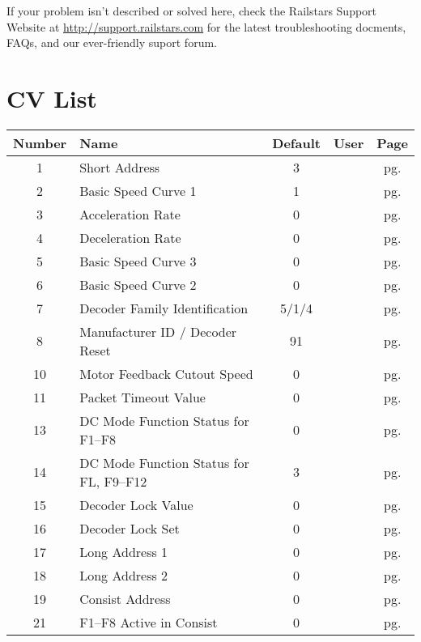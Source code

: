 \documentclass[12pt,letterpaper,draft]{memoir} %
\begin{document}
If your problem isn't described or solved here, check the Railstars Support Website at \url{http://support.railstars.com} for the latest troubleshooting docments, FAQs, and our ever-friendly suport forum.


\appendix
\chapter{CV List}

\begin{center}
\begin{longtable}{|c|l|c|c|c|}
\hline
Number&Name&Default&User&Page \\ \hline\hline
1&Short Address&3&&pg. \pageref{CV1} \\ \hline
2&Basic Speed Curve 1&1&&pg. \pageref{CV2} \\ \hline
3&Acceleration Rate&0&&pg. \pageref{CV3} \\ \hline
4&Deceleration Rate&0&&pg. \pageref{CV4} \\ \hline
5&Basic Speed Curve 3&0&&pg. \pageref{CV5} \\ \hline
6&Basic Speed Curve 2&0&&pg. \pageref{CV6} \\ \hline
7&Decoder Family Identification&5/1/4&&pg. \pageref{CV7} \\ \hline
8&Manufacturer ID / Decoder Reset&91&&pg. \pageref{CV8} \\ \hline
10&Motor Feedback Cutout Speed&0&&pg. \pageref{CV10} \\ \hline
11&Packet Timeout Value&0&&pg. \pageref{CV11} \\ \hline
13&DC Mode Function Status for F1--F8&0&&pg. \pageref{CV13} \\ \hline
14&DC Mode Function Status for FL, F9--F12&3&&pg. \pageref{CV14} \\ \hline
15&Decoder Lock Value&0&&pg. \pageref{CV15} \\ \hline
16&Decoder Lock Set&0&&pg. \pageref{CV16} \\ \hline
17&Long Address 1&0&&pg. \pageref{CV17} \\ \hline
18&Long Address 2&0&&pg. \pageref{CV18} \\ \hline
19&Consist Address&0&&pg. \pageref{CV19} \\ \hline
21&F1--F8 Active in Consist&0&&pg. \pageref{CV21} \\ \hline

\end{longtable}
\end{center}
\end{document}
